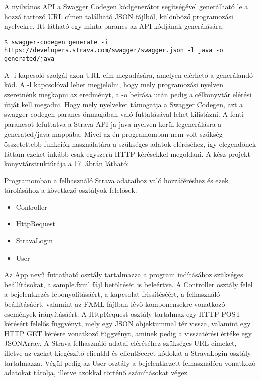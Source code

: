A nyilvános API a Swagger Codegen kódgenerátor segítségével generálható le a hozzá tartozó URL címen található JSON fájlból, különböző programozási nyelvekre. Itt látható egy minta parancs az API kódjának generálására: 

\begin{verbatim}
$ swagger-codegen generate -i https://developers.strava.com/swagger/swagger.json -l java -o generated/java 
\end{verbatim}

A -i kapcsoló szolgál azon URL cím megadására, amelyen elérhető a generálandó kód. A -l kapcsolóval lehet megjelölni, hogy mely programozási nyelven szeretnénk megkapni az eredményt, a -o beírása után pedig a célkönyvtár elérési útját kell megadni. Hogy mely nyelveket támogatja a Swagger Codegen, azt a swagger-codegen parancs önmagában való futtatásával lehet kilistázni. A fenti parancsot lefuttatva a Strava API-ja java nyelven kerül legenerálásra a generated/java mappába. Mivel az én programomban nem volt szükség összetettebb funkciók használatára a szükséges adatok eléréséhez, így elegendőnek láttam ezeket inkább csak egyszerű HTTP kérésekkel megoldani. A kész projekt könyvtárstruktúrája a 17. ábrán látható: 



Programomban a felhasználó Strava adataihoz való hozzáféréshez és ezek tárolásához a következő osztályok felelősek: 

\begin{itemize}
\item Controller 
\item HttpRequest
\item StravaLogin 
\item User
\end{itemize}
 

Az App nevű futtatható osztály tartalmazza a program indításához szükséges beállításokat, a sample.fxml fájl betöltését is beleértve. A Controller osztály felel a bejelentkezés lebonyolításáért, a kapcsolat frissítéséért, a felhasználó beállításáért, valamint az FXML fájlban lévő komponensekre vonatkozó események irányításáért. A HttpRequest osztály tartalmaz egy HTTP POST kérésért felelős függvényt, mely egy JSON objektummal tér vissza, valamint egy HTTP GET kérésre vonatkozó függvényt, aminek pedig a visszatérési értéke egy JSONArray. A Strava felhasználó adatai eléréséhez szükséges URL címeket, illetve az ezeket kiegészítő clientId és clientSecret kódokat a StravaLogin osztály tartalmazza. Végül pedig az User osztály a bejelentkezett felhasználóra vonatkozó adatokat tárolja, illetve azokkal történő számításokat végez. 


